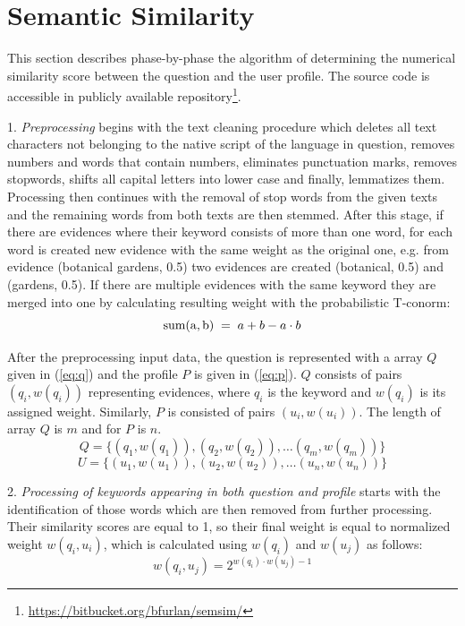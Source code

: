 \documentclass[conference]{IEEEtran}
\begin{document}
\section{Semantic Similarity}
\label{sec:alg}
This section describes phase-by-phase the algorithm of determining the numerical similarity score between the question and the user profile. The source code is accessible in publicly available repository\footnote{\url{https://bitbucket.org/bfurlan/semsim/}}.
	
1. {\it Preprocessing} begins with the text cleaning procedure which deletes all text characters not belonging to the native script of the language in question, removes numbers and words that contain numbers, eliminates punctuation marks, removes stopwords, shifts all capital letters into lower case and finally, lemmatizes them. Processing then continues with the removal of stop words from the given texts and the remaining words from both texts are then stemmed. After this stage, if there are evidences where their keyword consists of more than one word, for each word is created new evidence with the same weight as the original one, e.g. from evidence (botanical gardens, 0.5) two evidences are created (botanical, 0.5) and (gardens, 0.5). If there are multiple evidences with the same keyword they are merged into one by calculating resulting weight with the probabilistic T-conorm: 
\vspace{-0.1cm}
\begin{equation}
	\label{eq:tconorm}
	{\rm sum(a,b)}\;=\;a+b-a\cdot b
\end{equation}

\vspace{-0.3cm}
After the preprocessing input data, the question is represented with a array $Q$ given in (\ref{eq:q}) and the profile $P$ is given in (\ref{eq:p}). $Q$ consists of pairs $(q_i,w(q_i))$ representing evidences, where $q_i$ is the keyword and $w(q_i)$ is its assigned weight. Similarly, $P$ is consisted of pairs $(u_i,w(u_i))$. The length of array $Q$ is $m$ and for $P$ is $n$.
\vspace{-0.2cm}
\begin{equation}
	\label{eq:q}
	Q = \{(q_1,w(q_1)),(q_2,w(q_2)),\ldots(q_m,w(q_m))\}
\end{equation} 
\begin{equation}
	\label{eq:p}
	U=\{(u_1,w(u_1)),(u_2,w(u_2)),\ldots(u_n,w(u_n))\}
\end{equation}

\vspace{-0.3cm}    
2. {\it Processing of keywords appearing in both question and profile} starts with the identification of those words which are then removed from further processing. Their similarity scores are equal to 1, so their final weight is equal to normalized weight $w(q_i,u_i)$, which is calculated using $w(q_i)$ and $w(u_j)$ as follows:
\begin{equation}
	\label{eq:w}
	w(q_i,u_j)=2^{w(q_i)\cdot w(u_j)-1}
\end{equation}
\end{document}
